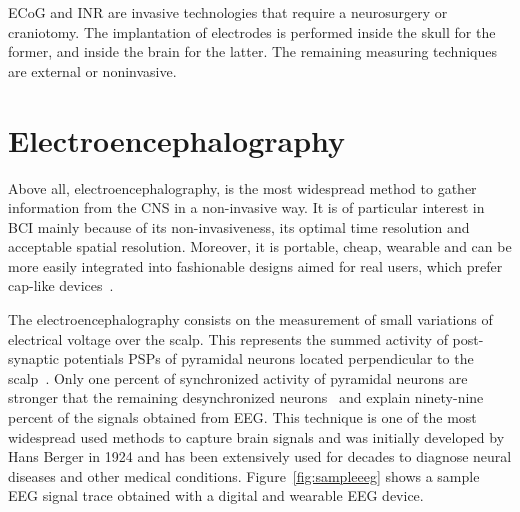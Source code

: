 ECoG and INR are invasive technologies that require a neurosurgery or craniotomy. The implantation of electrodes is performed inside the skull for the former, and inside the brain for the latter.   The remaining measuring techniques are external or noninvasive.  

\section{Electroencephalography}
\label{EEG}
Above all, electroencephalography, is the most widespread method to gather information from the CNS in a non-invasive way. It is of particular interest in BCI mainly because of its non-invasiveness, its optimal time resolution and acceptable spatial resolution. Moreover, it is portable, cheap, wearable and can be more easily integrated into fashionable designs aimed for real users, which prefer cap-like devices~\cite{Huggins2015}. 

The electroencephalography consists on the measurement of small variations of electrical voltage over the scalp. This represents the summed activity of post-synaptic potentials PSPs of pyramidal neurons located perpendicular to the scalp~\cite{Nam2018}. Only one percent of synchronized activity of pyramidal neurons are stronger that the remaining desynchronized neurons~\cite{Schomer2010} and explain ninety-nine percent of the signals obtained from EEG.  This technique is one of the most widespread used methods to capture brain signals and was initially developed by Hans Berger in 1924 and has been extensively used for decades to diagnose neural diseases and other medical conditions.  Figure~\ref{fig:sampleeeg} shows a sample EEG signal trace obtained with a digital and wearable EEG device.



